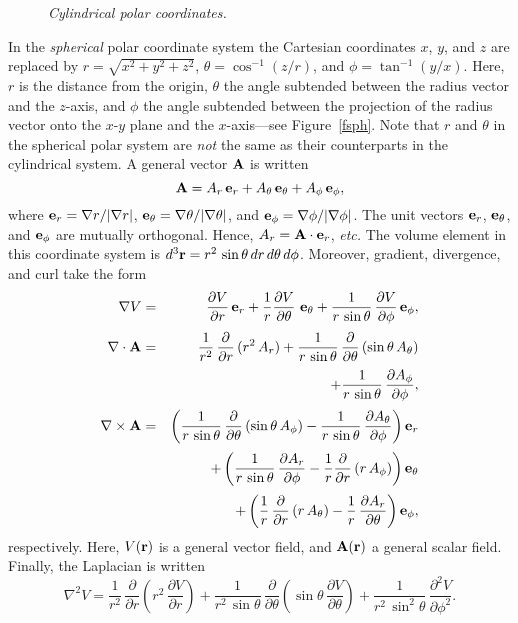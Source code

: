 \begin{figure}
\epsfysize=3.25in
\centerline{}
\caption{\em Cylindrical polar coordinates.}\label{fcyl}
\end{figure}


In the {\em spherical}\/ polar coordinate system the Cartesian coordinates
$x$, $y$, and $z$
are replaced by $r=\sqrt{x^2+y^2+z^2}$, $\theta = \cos^{-1}(z/r)$,
and $\phi=\tan^{-1}(y/x)$. Here, $r$ is the distance from the origin,
$\theta$ the angle subtended between the radius vector and the $z$-axis,
and $\phi$ the angle subtended between the projection of the radius vector
onto the $x$-$y$ plane and the $x$-axis---see Figure~\ref{fsph}.
Note that $r$ and $\theta$ in the spherical polar system are {\em not}\/ the same as their counterparts in the cylindrical system.
A general vector ${\bf A}$ is written
\begin{equation}
{\bf A} = A_r\,{\bf e}_r + A_\theta\,{\bf e}_\theta+ A_\phi\,{\bf e}_\phi,
\end{equation}
where ${\bf e}_r=\nabla r/|\nabla r|$, ${\bf e}_\theta = \nabla\theta/|\nabla\theta|$, and ${\bf e}_\phi = \nabla\phi/|\nabla\phi|$. The unit
vectors ${\bf e}_r$, ${\bf e}_\theta$, and ${\bf e}_\phi$ are mutually
orthogonal. Hence, $A_r = {\bf A}\cdot{\bf e}_r$, {\em etc.}
The
volume element in this coordinate system is $d^3{\bf r} = r^2\,\sin\theta\,dr\,d\theta\,d\phi$. 
Moreover, gradient, divergence, and curl take the form
\begin{eqnarray}
\nabla V &=& \frac{\partial V}{\partial r}\,{\bf e}_r
+ \frac{1}{r}\frac{\partial V}{\partial\theta}\,\,{\bf e}_\theta
+ \frac{1}{r\,\sin\theta}\,\frac{\partial V}{\partial \phi}\,{\bf e}_\phi,\\[0.5ex]
\nabla\cdot {\bf A} &=&\frac{1}{r^2}\,\frac{\partial}{\partial r}\,(r^2\,A_r) + \frac{1}{r\,\sin\theta}\,\frac{\partial }{\partial\theta} \,(\sin\theta\,A_\theta)\nonumber\\[0.5ex]&&+ \frac{1}{r\,\sin\theta}\,\frac{\partial A_\phi}{\partial \phi},\\[0.5ex]
\nabla\times{\bf A} &=& \left(\frac{1}{r\,\sin\theta}\,\frac{\partial}{\partial \theta}\,(\sin\theta \,A_\phi)-\frac{1}{r\,\sin\theta}\,\frac{\partial A_\theta}{\partial \phi}\right){\bf e}_r\nonumber\\[0.5ex]
&&+\left(\frac{1}{r\,\sin\theta}\,\frac{\partial A_r}{\partial \phi}-\frac{1}{r}\frac{\partial}{\partial r}\,(r\,A_\phi)\right){\bf e}_\theta\nonumber\\[0.5ex]
&&+ \left(\frac{1}{r}\,\frac{\partial}{\partial r}\,(r\,A_\theta) - \frac{1}{r}\,\frac{\partial A_r}{\partial\theta}\right){\bf e}_\phi,\label{spcurl1}
\end{eqnarray}
respectively. Here, $V({\bf r})$ is a general vector field, and ${\bf A}({\bf r})$ a general scalar field. Finally, the Laplacian is written
\begin{equation}
\nabla^2 V = \frac{1}{r^2}\,\frac{\partial}{\partial r}\left(r^2\,\frac{\partial V}{\partial r}\right) + \frac{1}{r^2\,\sin\theta}\,\frac{\partial }{\partial\theta}\left(\sin\theta\,\frac{\partial V}{\partial \theta}\right) + \frac{1}{r^2\,\sin^2\theta}\,\frac{\partial^2 V}{\partial \phi^2}.
\end{equation} 


